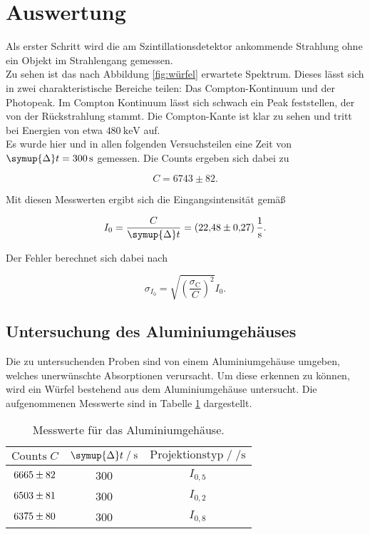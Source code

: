 \section{Auswertung}
\label{sec:Auswertung}

Als erster Schritt wird die am Szintillationsdetektor ankommende Strahlung ohne ein Objekt im Strahlengang gemessen. \\
Zu sehen ist das nach Abbildung \ref{fig:würfel} erwartete Spektrum. Dieses lässt sich in zwei charakteristische Bereiche teilen: Das 
Compton-Kontinuum und der Photopeak. Im Compton Kontinuum lässt sich schwach ein Peak feststellen, der von der Rückstrahlung 
stammt. Die Compton-Kante ist klar zu sehen und tritt bei Energien von etwa $\SI{480}{\kilo\electronvolt}$ auf.\\
Es wurde hier und in allen folgenden Versuchsteilen eine Zeit von $\symup{\Delta}t = \SI{300}{\second}$ gemessen. Die Counts 
ergeben sich dabei zu

\begin{equation*}
  C = 6743 \pm 82.
\end{equation*}

Mit diesen Messwerten ergibt sich die Eingangsintensität gemäß 

\begin{equation}
  I_0 = \frac{C}{\symup{\Delta}t} = \SI{22.48+-0.27}{\per\second}.
  \label{eqn:Int}
\end{equation}

Der Fehler berechnet sich dabei nach

\begin{equation*}
  \sigma_{I_0} = \sqrt{\left(\frac{\sigma_\text{C}}{C}\right)^2}I_0.
\end{equation*}

\subsection{Untersuchung des Aluminiumgehäuses}

Die zu untersuchenden Proben sind von einem Aluminiumgehäuse umgeben, welches unerwünschte Absorptionen verursacht. Um diese
erkennen zu können, wird ein Würfel bestehend aus dem Aluminiumgehäuse untersucht. Die aufgenommenen Messwerte sind in 
Tabelle \ref{tab:mess1} dargestellt. 

\begin{table}[H]
  \centering
  \caption{Messwerte für das Aluminiumgehäuse.}
  \label{tab:mess1}
  \begin{tabular}{c c c}
  \toprule
  $\text{Counts} \; C$ & $\symup{\Delta} t \;/\; \si{\second}$ & $\text{Projektionstyp} \;/\; \si{\per\second}$ \\
  \midrule
      $\num{6665+-82}$ & 300 & $I_{0,5}$\\
      $\num{6503+-81}$ & 300 & $I_{0,2}$\\
      $\num{6375+-80}$ & 300 & $I_{0,8}$\\
  \bottomrule
  \end{tabular}
\end{table}

